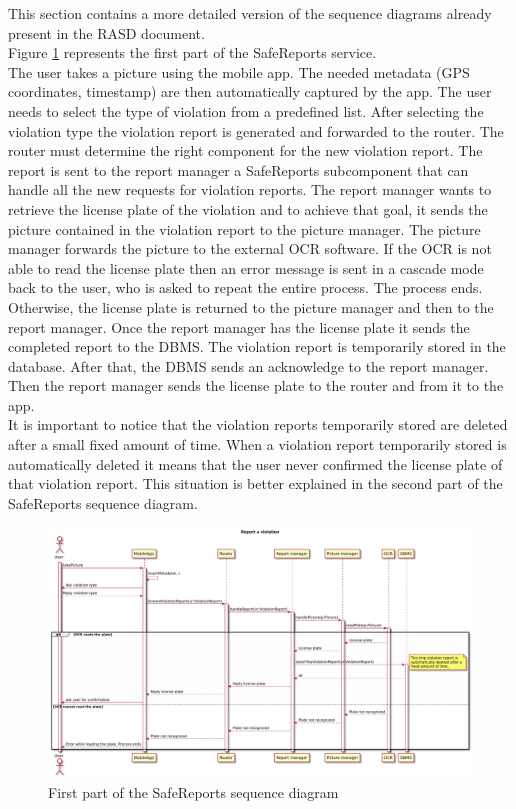 \documentclass[./main.tex]{subfiles}
\begin{document}
This section contains a more detailed version of the sequence diagrams already present in the RASD document. \\

Figure \ref{fig:sequence_safe_reports_1} represents the first part of the SafeReports service.\\
The user takes a picture using the mobile app. The needed metadata
(GPS coordinates, timestamp) are then automatically captured by the app.
The user needs to select the type of violation from a predefined list.
After selecting the violation type the violation report is generated and
forwarded to the router. The router must determine the right component for the new violation report. The report is sent to the report manager a SafeReports subcomponent that can handle all the new requests for violation reports.
The report manager wants to retrieve the license plate of the violation
and to achieve that goal, it sends the picture contained in the
violation report to the picture manager.
The picture manager forwards the picture to the external OCR software.
If the OCR is not able to read the license plate then an error message is
sent in a cascade mode back to the user, who is asked to repeat the entire process. The process ends.
\\Otherwise, the license plate is returned to the picture manager and then to the report manager.
Once the report manager has the license plate it sends the completed report to the DBMS. The violation report is temporarily stored in the database. After that, the DBMS sends an acknowledge to the report manager. Then the report manager sends the license plate to the router and from it to the app.
\\It is important to notice that the violation reports temporarily stored are deleted after a small fixed amount of time. When a violation report temporarily stored is automatically deleted it means that the user never confirmed the license plate of that violation report. This situation is better explained in the second part of the SafeReports sequence diagram.

\begin{figure}
\includegraphics[angle=90, width = 0.98 \textwidth, height = 0.98 \textheight]{resources/sequence/safeReports1}
\caption{First part of the SafeReports sequence diagram}
\label{fig:sequence_safe_reports_1}
\end{figure}
\end{document}
